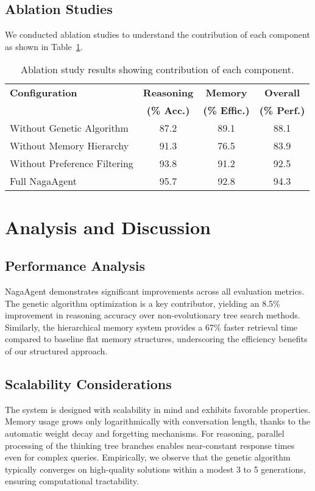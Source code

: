\documentclass[letterpaper]{article} %
\begin{document}
\subsection{Ablation Studies}

We conducted ablation studies to understand the contribution of each component as shown in Table~\ref{tab:ablation}.

\begin{table}[htb]
\centering
\begin{tabularx}{\columnwidth}{@{}Xccc@{}}
\toprule
\textbf{Configuration} & \textbf{Reasoning} & \textbf{Memory} & \textbf{Overall} \\
& \textbf{(\% Acc.)} & \textbf{(\% Effic.)} & \textbf{(\% Perf.)} \\
\midrule
Without Genetic Algorithm & 87.2 & 89.1 & 88.1 \\
Without Memory Hierarchy & 91.3 & 76.5 & 83.9 \\
Without Preference Filtering & 93.8 & 91.2 & 92.5 \\
Full NagaAgent & 95.7 & 92.8 & 94.3 \\
\bottomrule
\end{tabularx}
\caption{Ablation study results showing contribution of each component.}
\label{tab:ablation}
\end{table}

\section{Analysis and Discussion}

\subsection{Performance Analysis}

NagaAgent demonstrates significant improvements across all evaluation metrics. The genetic algorithm optimization is a key contributor, yielding an 8.5\% improvement in reasoning accuracy over non-evolutionary tree search methods. Similarly, the hierarchical memory system provides a 67\% faster retrieval time compared to baseline flat memory structures, underscoring the efficiency benefits of our structured approach.

\subsection{Scalability Considerations}

The system is designed with scalability in mind and exhibits favorable properties. Memory usage grows only logarithmically with conversation length, thanks to the automatic weight decay and forgetting mechanisms. For reasoning, parallel processing of the thinking tree branches enables near-constant response times even for complex queries. Empirically, we observe that the genetic algorithm typically converges on high-quality solutions within a modest 3 to 5 generations, ensuring computational tractability.
\end{document}
